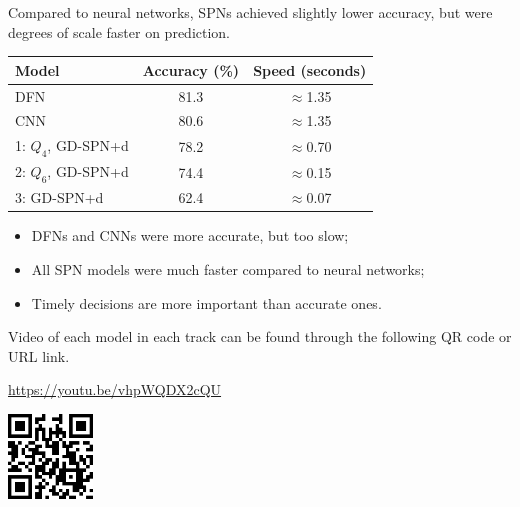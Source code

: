 \documentclass[a0paper,portrait]{baposter}
\begin{document}
\begin{poster}
{\begin{center}
\begin{minipage}[t][11.75cm]{0.98\textwidth}
\begin{minipage}{0.49\textwidth}
        Compared to neural networks, SPNs achieved slightly lower accuracy, but were degrees of
        scale faster on prediction.
        \begin{center}
          \centering
          \begin{tabular}{l|c|c}
            \textbf{Model} & \textbf{Accuracy (\%)} & \textbf{Speed (seconds)}\\
            \hline
            DFN & 81.3 & $\approx$1.35\\
            CNN & 80.6 & $\approx$1.35\\
            \hline
            1: $Q_4$, GD-SPN+d & 78.2 & $\approx$0.70\\
            2: $Q_6$, GD-SPN+d & 74.4 & $\approx$0.15\\
            3: GD-SPN+d & 62.4 & $\approx$0.07
          \end{tabular}
        \end{center}

        \begin{itemize}
          \item DFNs and CNNs were more accurate, but too slow;
          \item All SPN models were much faster compared to neural networks;
          \item Timely decisions are more important than accurate ones.
        \end{itemize}

        \begin{minipage}{0.55\textwidth}
          Video of each model in each track can be found through the following QR code or URL link.
          \vspace{0.25cm}

          \begin{flushright}
            \url{https://youtu.be/vhpWQDX2cQU}
          \end{flushright}
        \end{minipage}
        \begin{minipage}{0.55\textwidth}
          \vspace{-0.2cm}
          \hspace{1.5cm}\includegraphics[width=2.25cm]{qr.png}
        \end{minipage}
      \end{minipage}
    \end{minipage}
  \end{center}
}


\end{poster}
\end{document}
